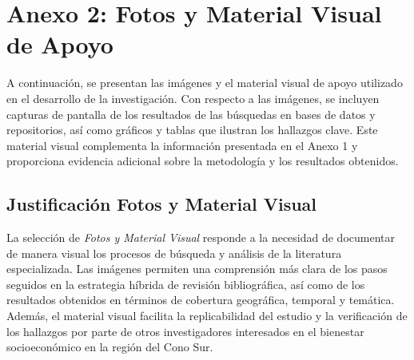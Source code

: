 \section{Anexo 2: Fotos y Material Visual de Apoyo}

A continuación, se presentan las imágenes y el material visual de apoyo utilizado en el desarrollo de la investigación. Con respecto a las imágenes, se incluyen capturas de pantalla de los resultados de las búsquedas en bases de datos y repositorios, así como gráficos y tablas que ilustran los hallazgos clave. Este material visual complementa la información presentada en el Anexo 1 y proporciona evidencia adicional sobre la metodología y los resultados obtenidos.

\subsection{Justificación Fotos y Material Visual}
La selección de \textit{Fotos y Material Visual} responde a la necesidad de documentar de manera visual los procesos de búsqueda y análisis de la literatura especializada. Las imágenes permiten una comprensión más clara de los pasos seguidos en la estrategia híbrida de revisión bibliográfica, así como de los resultados obtenidos en términos de cobertura geográfica, temporal y temática. Además, el material visual facilita la replicabilidad del estudio y la verificación de los hallazgos por parte de otros investigadores interesados en el bienestar socioeconómico en la región del Cono Sur.
